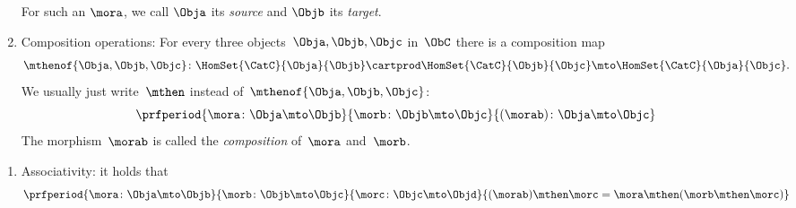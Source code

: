 \begin{ctdefinition}[Semicategory]
\begin{body}
\begin{enumerate}
                  For such an $\mora$, we call $\Obja$ its \emph{source} and $\Objb$ its \emph{target}.
            \item \label{semicategory-composition}
                  Composition operations: For every three objects~$\Obja,\Objb,\Objc$ in~$\ObC$ there is a composition map
                  \begin{equation}\label{eq:semicategory-composition}
                      \mthenof{\Obja,\Objb,\Objc}\colon \HomSet{\CatC}{\Obja}{\Objb} \cartprod \HomSet{\CatC}{\Objb}{\Objc}\mto \HomSet{\CatC}{\Obja}{\Objc}.
                  \end{equation}
                  We usually just write~$\mthen$ instead of~$\mthenof{\Obja,\Objb,\Objc}$:
                  \begin{equation}
                      \prfperiod{
                          \mora \colon \Obja \mto \Objb
                      }{
                          \morb\colon \Objb \mto \Objc
                      }{
                          (\morab )\colon \Obja \mto \Objc
                      }
                  \end{equation}
                  The morphism~$\morab$ is called the \emph{composition} of~$\mora$ and~$\morb$.
        \end{enumerate}
        \condit
        \begin{enumerate}
            \item \label{semicategory-associativity}
                  Associativity: it holds that
                  \begin{equation}
                      \prfperiod{
                          \mora\colon \Obja \mto \Objb
                      }{
                          \morb\colon \Objb \mto \Objc
                      }{
                          \morc\colon \Objc \mto \Objd
                      }{
                          (\morab)
                          \mthen \morc= \mora \mthen (\morb \mthen \morc)
                      }
                  \end{equation}
        \end{enumerate}
    \end{body}
\end{ctdefinition}

